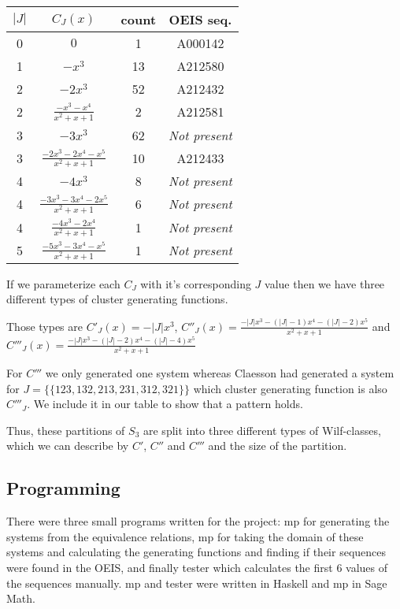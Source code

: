 \documentclass[a4paper, 11pt, english]{article}
\theoremstyle{definition}
\newcommand{\Sym}{S}
\begin{document}
\begin{center}
\begin{tabular}{c|c|c|c}
    $|J|$ & $C_J(x)$ & count & OEIS seq. \\
    \hline
    0 & $0$ & 1 & A000142 \\
    1 & $-x^3$ & 13 & A212580 \\
    2 & $-2x^3$ & 52 & A212432 \\
    2 & $\frac{-x^3-x^4}{x^2+x+1}$ & 2 & A212581 \\
    3 & $-3x^3$ & 62 & \emph{Not present} \\
    3 & $\frac{-2x^3-2x^4-x^5}{x^2+x+1}$ & 10 & A212433 \\
    4 & $-4x^3$ & 8 & \emph{Not present} \\
    4 & $\frac{-3x^3-3x^4-2x^5}{x^2+x+1}$ & 6 & \emph{Not present}\\
    4 & $\frac{-4x^3-2x^4}{x^2+x+1}$ & 1 & \emph{Not present} \\ 
    \hline
    \hline
    5 & $\frac{-5x^3-3x^4-x^5}{x^2+x+1}$ & 1 & \emph{Not present} \\ 
\end{tabular}
\end{center}

If we parameterize each $C_J$ with it's corresponding $J$ value then we have
three different types of cluster generating functions.

Those types are $C'_J(x) = -|J|x^3$, $C''_J(x) = \frac{-|J|x^3-(|J|-1)x^4-(|J|-2)x^5}{x^2+x+1}$
and $C'''_J(x) = \frac{-|J|x^3-(|J|-2)x^4-(|J|-4)x^5}{x^2+x+1}$

For $C'''$ we only generated one system whereas Claesson had generated a system for
$J = \{\{ 123, 132, 213, 231, 312, 321 \}\}$ which cluster generating function
is also $C'''_J$. We include it in our table to show that a pattern holds.

Thus, these partitions of $\Sym_3$ are split into three different types
of Wilf-classes, which we can describe by $C'$, $C''$ and $C'''$ and the size
of the partition.

\subsection{Programming}
There were three small programs written for the project: mp for generating the
systems from the equivalence relations, mp for taking the domain of these
systems and calculating the generating functions and finding if their sequences
were found in the OEIS, and finally tester which calculates the first 6 values
of the sequences manually. mp and tester were written in Haskell and mp in Sage Math. 
\end{document}
